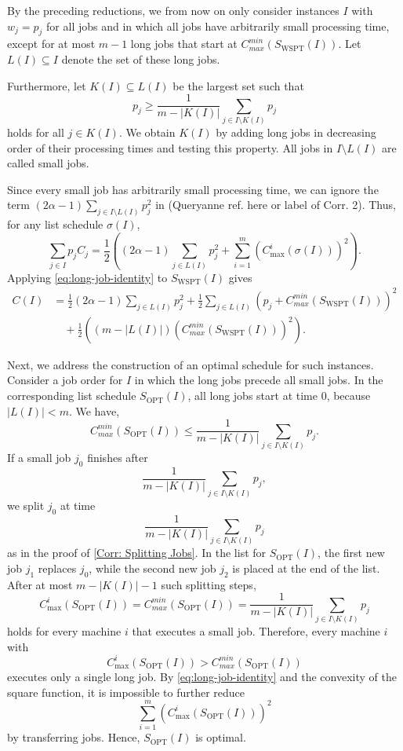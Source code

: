 \documentclass{article}
\newcommand{\WSPT}{\mathrm{WSPT}}
\newcommand{\OPT}{\mathrm{OPT}}
\begin{document}
By the preceding reductions, we from now on only consider instances $I$
with $w_j=p_j$ for all jobs and in which all jobs have arbitrarily small
processing time, except for at most $m-1$ long jobs that start at
$C_{max}^{min}(S_{\WSPT}(I))$. Let $L(I)\subseteq I$ denote the set of these long jobs.

Furthermore, let $K(I)\subseteq L(I)$ be the largest set such that
\[
        p_j\geq \frac1{m-|K(I)|}\sum_{j\in I\setminus K(I)}p_j
\]
holds for all $j\in K(I)$. We obtain $K(I)$ by adding long jobs in decreasing
order of their processing times and testing this property. All jobs in
$I\setminus L(I)$ are called small jobs.

Since every small job has arbitrarily small processing time, we can ignore
the term $(2\alpha-1)\sum_{j\in I\setminus L(I)}p_j^2$ in
(Queryanne ref. here or label of Corr. 2). Thus, for any list schedule $\sigma(I)$,
\begin{equation}
\label{eq:long-job-identity}
        \sum_{j\in I}p_j C_j
        =
        \frac12
        \left(
            (2\alpha-1)\sum_{j\in L(I)}p_j^2
            +
            \sum_{i=1}^m(C_{\max}^i(\sigma(I)))^2
        \right).
\end{equation}
Applying \eqref{eq:long-job-identity} to $S_{\WSPT}(I)$ gives
\begin{equation}
\label{eq:wspt-value}
\begin{aligned}
        C(I)
        &=
        \frac12(2\alpha-1)\sum_{j\in L(I)}p_j^2
        +
        \frac12\sum_{j\in L(I)}
            (p_j+C_{max}^{min}(S_{\WSPT}(I)))^2                    \\
        &\quad
        +
        \frac12\left((m-|L(I)|)(C_{max}^{min}(S_{\WSPT}(I)))^2\right).
\end{aligned}
\end{equation}

Next, we address the construction of an optimal schedule for such instances.
Consider a job order for $I$ in which the long jobs precede all small jobs.
In the corresponding list schedule $S_{\OPT}(I)$, all long jobs start at time
$0$, because $|L(I)|<m$. We have,
\[
        C_{max}^{min}(S_{\OPT}(I))
        \leq
        \frac1{m-|K(I)|}\sum_{j\in I\setminus K(I)}p_j .
\]
If a small job $j_0$ finishes after
\[
        \frac1{m-|K(I)|}\sum_{j\in I\setminus K(I)}p_j ,
\]
we split $j_0$ at time
\[
        \frac1{m-|K(I)|}\sum_{j\in I\setminus K(I)}p_j
\]
as in the proof of \ref{Corr: Splitting Jobs}. In the list for $S_{\OPT}(I)$, the first new job
$j_1$ replaces $j_0$, while the second new job $j_2$ is placed at the end of
the list. After at most $m-|K(I)|-1$ such splitting steps,
\[
        C_{\max}^i(S_{\OPT}(I))
        =
        C_{max}^{min}(S_{\OPT}(I))
        =
        \frac1{m-|K(I)|}\sum_{j\in I\setminus K(I)}p_j
\]
holds for every machine $i$ that executes a small job. Therefore, every
machine $i$ with
\[
        C_{\max}^i(S_{\OPT}(I))>C_{max}^{min}(S_{\OPT}(I))
\]
executes only a single long job. By \eqref{eq:long-job-identity} and the
convexity of the square function, it is impossible to further reduce
\[
        \sum_{i=1}^m(C_{\max}^i(S_{\OPT}(I)))^2
\]
by transferring jobs. Hence, $S_{\OPT}(I)$ is optimal.
\end{document}
